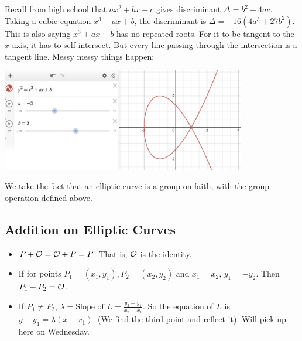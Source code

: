 Recall from high school that $ax^2 + bx + c$ gives discriminant $\Delta = b^2 - 4ac$. Taking a cubic equation $x^3 + ax + b$, the discriminant is $\Delta = -16(4a^3 + 27b^2)$. This is also saying $x^3 + ax + b$ has no repeated roots. For it to be tangent to the $x$-axis, it has to self-intersect. But every line passing through the intersection is a tangent line. Messy messy things happen:
\begin{center}
    \includegraphics[width=0.8\textwidth]{images/fish.png}
\end{center}

We take the fact that an elliptic curve is a group on faith, with the group operation defined above.

\subsection{Addition on Elliptic Curves}
\begin{itemize}
    \item $P + \mathcal{O} = \mathcal{O} + P = P$. That is, $\mathcal{O}$ is the identity.
    \item If for points $P_1 = (x_1, y_1), P_2 = (x_2, y_2)$ and $x_1 = x_2$, $y_1 = -y_2$. Then $P_1 + P_2 = \mathcal{O}$.
    \item If $P_1 \neq P_2$, $\lambda = \text{Slope of $L$} = \frac{y_2-y_1}{x_2-x_1}$. So the equation of $L$ is $y-y_1 = \lambda(x-x_1)$. (We find the third point and reflect it). Will pick up here on Wednesday.
\end{itemize}
